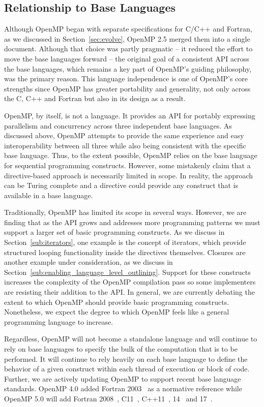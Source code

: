 \subsection{Relationship to Base Languages}
\label{sub:relationship_to_base_languages}

Although OpenMP began with separate specifications for C/C++ and 
Fortran, as we discussed in Section~\ref{sec:evolve}, OpenMP 2.5 
merged them into a single document. Although that choice was
partly pragmatic -- it reduced the effort to move the base languages 
forward -- the original goal of a consistent API across the base 
languages, which remains a key part of OpenMP's guiding philosophy, 
was the primary reason. This language independence is one of OpenMP's 
core strengths since OpenMP has greater portability and generality, 
not only across the C, C++ and Fortran but also in its design as a result. 

OpenMP, by itself, is not a language.  It provides an API for portably
expressing parallelism and concurrency across three independent base languages.
As discussed above, OpenMP attempts to provide the same experience and easy
interoperability between all three while also being consistent with the 
specific base language. Thus, to the extent possible, OpenMP relies on the 
base language for sequential programming constructs. However, some mistakenly 
claim that a directive-based approach is necessarily limited in scope. In 
reality, the approach can be Turing complete and a directive could provide 
any construct that is available in a base language.

Traditionally, OpenMP has limited its scope in several ways. However, we 
are finding that as the API grows and addresses more programming patterns
we must support a larger set of basic programming constructs. As we
discuss in Section~\ref{sub:iterators}, one example is the concept of 
iterators, which provide structured looping functionality inside the directives
themselves. Closures are another example under consideration, as we discuss in
Section~\ref{sub:enabling_language_level_outlining}. Support for these
constructs increases the complexity of the OpenMP compilation pass so some
implementers are resisting their addition to the API. In general, we are
currently debating the extent to which OpenMP should provide basic programming
constructs. Nonetheless, we expect the degree to which OpenMP feels like a
general programming language to increase.

Regardless, OpenMP will not become a standalone language and will 
continue to rely on base languages to specify the bulk of the
computation that is to be performed. It will continue to rely heavily 
on each base language to define the behavior of a given construct 
within each thread of execution or block of code. Further, we are
actively updating OpenMP to support recent base language standards. 
OpenMP 4.0 added Fortran 2003~\cite{F2003} as a normative reference
while OpenMP 5.0 will add Fortran 2008~\cite{F2008}, C11~\cite{c11}, 
C++11~\cite{c++11}, 14~\cite{c++14} and 17~\cite{c++17}.

